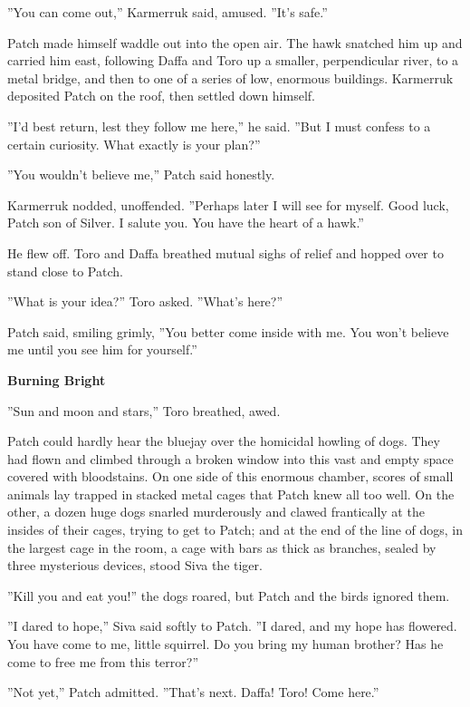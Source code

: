 \documentclass[11pt]{article}
\begin{document}
 ''You can come out,'' Karmerruk said, amused. ''It's safe.''\par
 Patch made himself waddle out into the open air. The hawk snatched him up and carried him east, following Daffa and Toro up a smaller, perpendicular river, to a metal bridge, and then to one of a series of low, enormous buildings. Karmerruk deposited Patch on the roof, then settled down himself.\par
 ''I'd best return, lest they follow me here,'' he said. ''But I must confess to a certain curiosity. What exactly is your plan?''\par
 ''You wouldn't believe me,'' Patch said honestly.\par
 Karmerruk nodded, unoffended. ''Perhaps later I will see for myself. Good luck, Patch son of Silver. I salute you. You have the heart of a hawk.''\par
 He flew off. Toro and Daffa breathed mutual sighs of relief and hopped over to stand close to Patch.\par
 ''What is your idea?'' Toro asked. ''What's here?''\par
 Patch said, smiling grimly, ''You better come inside with me. You won't believe me until you see him for yourself.''\par
\par
{\bf Burning Bright\par
}\par
 ''Sun and moon and stars,'' Toro breathed, awed.\par
 Patch could hardly hear the bluejay over the homicidal howling of dogs. They had flown and climbed through a broken window into this vast and empty space covered with bloodstains. On one side of this enormous chamber, scores of small animals lay trapped in stacked metal cages that Patch knew all too well. On the other, a dozen huge dogs snarled murderously and clawed frantically at the insides of their cages, trying to get to Patch; and at the end of the line of dogs, in the largest cage in the room, a cage with bars as thick as branches, sealed by three mysterious devices, stood Siva the tiger.\par
 ''Kill you and eat you!'' the dogs roared, but Patch and the birds ignored them.\par
 ''I dared to hope,'' Siva said softly to Patch. ''I dared, and my hope has flowered. You have come to me, little squirrel. Do you bring my human brother? Has he come to free me from this terror?''\par
 ''Not yet,'' Patch admitted. ''That's next. Daffa! Toro! Come here.''\par
\end{document}
